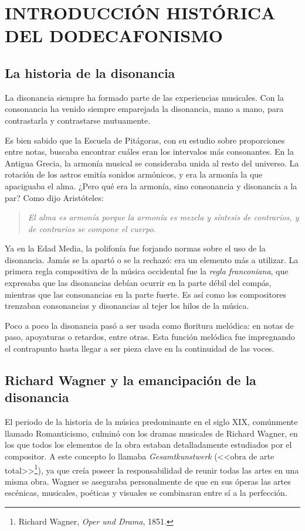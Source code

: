 \section[INTRODUCCI\'ON HIST\'ORICA DEL DODECAFONISMO]{INTRODUCCI\'ON HIST\'ORICA DEL DODECAFONISMO}\label{ch:historia}

	\subsection{La historia de la disonancia}
	La disonancia siempre ha formado parte de las experiencias musicales. Con la consonancia ha venido siempre emparejada la disonancia, mano a mano, para contrastarla y contrastarse mutuamente.
	
	Es bien sabido que la Escuela de Pitágoras, con su estudio sobre proporciones entre notas, buscaba encontrar cuáles eran los intervalos más consonantes. En la Antigua Grecia, la armonía musical se consideraba unida al resto del universo. La rotación de los astros emitía sonidos armónicos, y era la armonía la que apaciguaba el alma. ¿Pero qué era la armonía, sino consonancia y disonancia a la par? Como dijo Aristóteles:
	\begin{quote}
		\emph{El alma es armonía porque la armonía es mezcla y síntesis de contrarios, y de contrarios se compone el cuerpo.} \cite{mha}
	\end{quote}

	Ya en la Edad Media, la polifonía fue forjando normas sobre el uso de la disonancia. Jamás se la apartó o se la rechazó: era un elemento más a utilizar. La primera regla compositiva de la música occidental \cite{jeppesen} fue la \emph{regla franconiana}, que expresaba que
	las disonancias debían ocurrir en la parte débil del compás, mientras que las consonancias en la parte fuerte. Es así como los compositores trenzaban consonancias y disonancias al tejer los hilos de la música.
	
	Poco a poco la disonancia pasó a ser usada como floritura melódica: en notas de paso, apoyaturas o retardos, entre otras. Esta función melódica fue impregnando el contrapunto hasta llegar a ser pieza clave en la continuidad de las voces.
	
	\subsection{Richard Wagner y la emancipaci\'on de la disonancia}
	
		El periodo de la historia de la m\'usica predominante en el siglo XIX, com\'unmente llamado Romanticismo, culmin\'o con los dramas musicales de Richard Wagner, en los que todos los elementos de la obra estaban detalladamente estudiados por el compositor. A este concepto lo llamaba \emph{Gesamtkunstwerk} (<<{obra de arte total}>>\footnote{Richard Wagner, \emph{Oper und Drama}, 1851.}), ya que cre\'ia poseer la responsabilidad de reunir todas las artes en una misma obra. Wagner se aseguraba personalmente de que en sus \'operas las artes esc\'enicas, musicales, po\'eticas y visuales se combinaran entre s\'i a la perfecci\'on.
		
